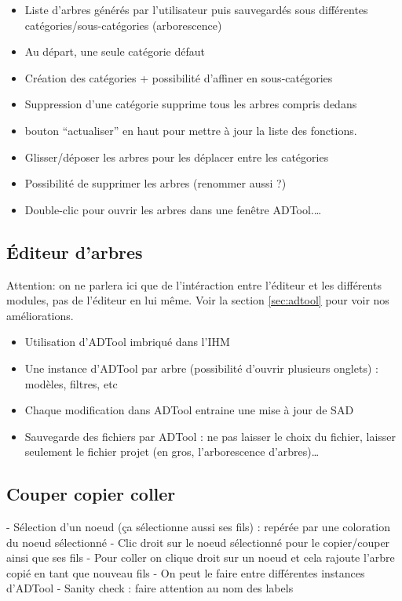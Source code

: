 		\begin{itemize}
			\item Liste d'arbres générés par l'utilisateur puis sauvegardés sous différentes catégories/sous-catégories (arborescence)
			\item Au départ, une seule catégorie défaut
			\item  Création des catégories + possibilité d'affiner en sous-catégories
			\item Suppression d'une catégorie supprime tous les arbres compris dedans
			\item bouton “actualiser” en haut pour mettre à jour la liste des fonctions.
			\item Glisser/déposer les arbres pour les déplacer entre les catégories
			\item Possibilité de supprimer les arbres (renommer aussi ?)
			\item Double-clic pour ouvrir les arbres dans une fenêtre ADTool.\ldots
		\end{itemize}
		
	\subsection{Éditeur d'arbres}

		Attention: on ne parlera ici que de l'intéraction entre l'éditeur et les différents modules, pas de l'éditeur en lui même.
		Voir la section \ref{sec:adtool} pour voir nos améliorations.

		\begin{itemize}
			\item  Utilisation d'ADTool imbriqué dans l'IHM
			\item Une instance d'ADTool par arbre (possibilité d'ouvrir plusieurs onglets) : modèles, filtres, etc
			\item Chaque modification dans ADTool entraine une mise à jour de SAD
			\item Sauvegarde des fichiers par ADTool : ne pas laisser le choix du fichier, laisser seulement le fichier projet (en gros, l'arborescence d'arbres)\ldots
		\end{itemize}


	\subsection{Couper copier coller}
	
	- Sélection d'un noeud (ça sélectionne aussi ses fils) : repérée par une coloration du noeud sélectionné
	- Clic droit sur le noeud sélectionné pour le copier/couper ainsi que ses fils
	- Pour coller on clique droit sur un noeud et cela rajoute l'arbre copié en tant que nouveau fils
	- On peut le faire entre différentes instances d'ADTool
	- Sanity check : faire attention au nom des labels

